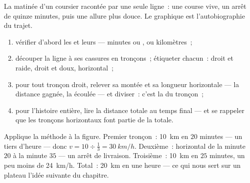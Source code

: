 \begin{omfigure}

{\small La matinée d'un coursier racontée par une seule ligne~: une
course vive, un arrêt de quinze minutes, puis une allure plus douce.
Le graphique est l'autobiographie du trajet.}
\end{omfigure}

\begin{method}\label{met:g7:motion-average-speed:read}
\begin{enumerate}
  \item vérifier d'abord les  et leurs  --- minutes ou
        ,  ou kilomètres~;
  \item découper la ligne à ses cassures en tronçons~; étiqueter
        chacun~: droit et raide, droit et doux, horizontal~;
  \item pour tout tronçon droit, relever sa montée et sa longueur
        horizontale --- la distance gagnée, la  écoulée --- et
        diviser~: c'est la  du tronçon~;
  \item pour l'histoire entière, lire la distance totale au temps
        final --- et se rappeler que les tronçons horizontaux font
        partie de la  totale.
\end{enumerate}
\end{method}

\begin{example}\label{ex:g7:motion-average-speed:decoded}
Applique la méthode à la figure. Premier tronçon~: \qty{10}{km} en
$20$ minutes --- un tiers d'heure --- donc
$v = 10 \div \tfrac{1}{3} = \qty{30}{km/h}$. Deuxième~: horizontal de
la minute $20$ à la minute $35$ --- un arrêt de livraison.
Troisième~: \qty{10}{km} en $25$ minutes, un peu moins de
\qty{24}{km/h}. Total~: \qty{20}{km} en une heure --- ce qui nous
sert sur un plateau l'idée suivante du chapitre.
\end{example}


